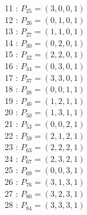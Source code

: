 \documentclass{article}
\begin{document}
{\begin{multicols}{3}
11 : $P_{25}=( 3, 0, 0, 1 )$\\
12 : $P_{26}=( 0, 1, 0, 1 )$\\
13 : $P_{27}=( 1, 1, 0, 1 )$\\
14 : $P_{30}=( 0, 2, 0, 1 )$\\
15 : $P_{32}=( 2, 2, 0, 1 )$\\
16 : $P_{34}=( 0, 3, 0, 1 )$\\
17 : $P_{37}=( 3, 3, 0, 1 )$\\
18 : $P_{38}=( 0, 0, 1, 1 )$\\
19 : $P_{46}=( 1, 2, 1, 1 )$\\
20 : $P_{50}=( 1, 3, 1, 1 )$\\
21 : $P_{53}=( 0, 0, 2, 1 )$\\
22 : $P_{59}=( 2, 1, 2, 1 )$\\
23 : $P_{63}=( 2, 2, 2, 1 )$\\
24 : $P_{67}=( 2, 3, 2, 1 )$\\
25 : $P_{69}=( 0, 0, 3, 1 )$\\
26 : $P_{76}=( 3, 1, 3, 1 )$\\
27 : $P_{80}=( 3, 2, 3, 1 )$\\
28 : $P_{84}=( 3, 3, 3, 1 )$\\
\end{multicols}


%


%


}%
\end{document}
